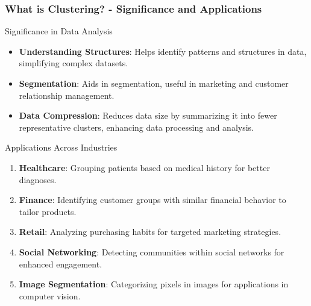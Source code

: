 \documentclass{beamer}
\begin{document}
\begin{frame}[fragile]
    \frametitle{What is Clustering? - Significance and Applications}
    \begin{block}{Significance in Data Analysis}
        \begin{itemize}
            \item \textbf{Understanding Structures}: Helps identify patterns and structures in data, simplifying complex datasets.
            \item \textbf{Segmentation}: Aids in segmentation, useful in marketing and customer relationship management.
            \item \textbf{Data Compression}: Reduces data size by summarizing it into fewer representative clusters, enhancing data processing and analysis.
        \end{itemize}
    \end{block}

    \begin{block}{Applications Across Industries}
        \begin{enumerate}
            \item \textbf{Healthcare}: Grouping patients based on medical history for better diagnoses.
            \item \textbf{Finance}: Identifying customer groups with similar financial behavior to tailor products.
            \item \textbf{Retail}: Analyzing purchasing habits for targeted marketing strategies.
            \item \textbf{Social Networking}: Detecting communities within social networks for enhanced engagement.
            \item \textbf{Image Segmentation}: Categorizing pixels in images for applications in computer vision.
        \end{enumerate}
    \end{block}
\end{frame}
\end{document}
